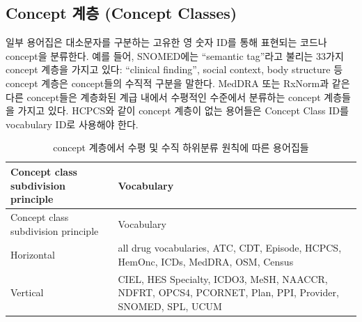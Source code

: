 \documentclass[11pt]{book}
\theoremstyle{definition}
\theoremstyle{definition}
\theoremstyle{definition}
\theoremstyle{remark}
\begin{document}
\subsection{Concept 계층 (Concept
Classes)}\label{concept--concept-classes}

일부 용어집은 대소문자를 구분하는 고유한 영 숫자 ID를 통해 표현되는
코드나 concept을 분류한다. 예를 들어, SNOMED에는 ``semantic tag''라고
불리는 33가지 concept 계층을 가지고 있다: ``clinical finding'', social
context, body structure 등 concept 계층은 concept들의 수직적 구분을
말한다. MedDRA 또는 RxNorm과 같은 다른 concept들은 계층화된 계급 내에서
수평적인 수준에서 분류하는 concept 계층들을 가지고 있다. HCPCS와 같이
concept 계층이 없는 용어들은 Concept Class ID를 vocabulary ID로 사용해야
한다. 

\begin{longtable}[]{@{}ll@{}}
\caption{\label{tab:sublassification}concept 계층에서 수평 및 수직 하위분류
원칙에 따른 용어집들}\tabularnewline
\toprule
\begin{minipage}[b]{0.13\columnwidth}\raggedright\strut
Concept class subdivision principle\strut
\end{minipage} & \begin{minipage}[b]{0.47\columnwidth}\raggedright\strut
Vocabulary\strut
\end{minipage}\tabularnewline
\midrule
\endfirsthead
\toprule
\begin{minipage}[b]{0.13\columnwidth}\raggedright\strut
Concept class subdivision principle\strut
\end{minipage} & \begin{minipage}[b]{0.47\columnwidth}\raggedright\strut
Vocabulary\strut
\end{minipage}\tabularnewline
\midrule
\endhead
\begin{minipage}[t]{0.13\columnwidth}\raggedright\strut
Horizontal\strut
\end{minipage} & \begin{minipage}[t]{0.47\columnwidth}\raggedright\strut
all drug vocabularies, ATC, CDТ, Episode, HCPCS, HemOnc, ICDs, MedDRA,
OSM, Census\strut
\end{minipage}\tabularnewline
\begin{minipage}[t]{0.13\columnwidth}\raggedright\strut
Vertical\strut
\end{minipage} & \begin{minipage}[t]{0.47\columnwidth}\raggedright\strut
CIEL, HES Specialty, ICDO3, MeSH, NAACCR, NDFRT, OPCS4, PCORNET, Plan,
PPI, Provider, SNOMED, SPL, UCUM\strut

\end{minipage}
\end{longtable}
\end{document}
